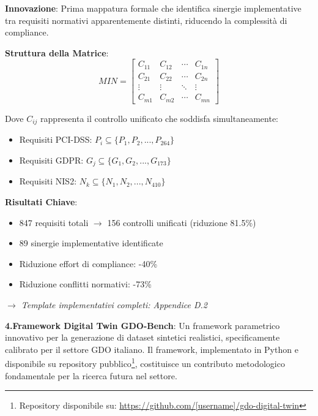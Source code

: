 \begin{tcolorbox}[
    colback=orange!5!white,
    colframe=orange!75!black,
    title={\textbf{Innovation Box 1.3:} Matrice di Integrazione Normativa (MIN)},
    fonttitle=\bfseries,
    boxrule=1.5pt,
    arc=2mm,
    breakable
]
\textbf{Innovazione}: Prima mappatura formale che identifica sinergie implementative tra requisiti normativi apparentemente distinti, riducendo la complessità di compliance.

\vspace{0.3cm}
\textbf{Struttura della Matrice}:
\begin{equation*}
MIN = \begin{bmatrix}
C_{11} & C_{12} & \cdots & C_{1n} \\
C_{21} & C_{22} & \cdots & C_{2n} \\
\vdots & \vdots & \ddots & \vdots \\
C_{m1} & C_{m2} & \cdots & C_{mn}
\end{bmatrix}
\end{equation*}

Dove $C_{ij}$ rappresenta il controllo unificato che soddisfa simultaneamente:
\begin{itemize}
    \item Requisiti PCI-DSS: $P_i \subseteq \{P_1, P_2, ..., P_{264}\}$
    \item Requisiti GDPR: $G_j \subseteq \{G_1, G_2, ..., G_{173}\}$
    \item Requisiti NIS2: $N_k \subseteq \{N_1, N_2, ..., N_{410}\}$
\end{itemize}

\vspace{0.3cm}
\textbf{Risultati Chiave}:
\begin{itemize}
    \item 847 requisiti totali $\rightarrow$ 156 controlli unificati (riduzione 81.5\%)
    \item 89 sinergie implementative identificate
    \item Riduzione effort di compliance: -40\%
    \item Riduzione conflitti normativi: -73\%
\end{itemize}

\vspace{0.2cm}
\textit{$\rightarrow$ Template implementativi completi: Appendice D.2}
\end{tcolorbox}

\textbf{4.Framework Digital Twin GDO-Bench}: Un framework parametrico innovativo per la generazione di dataset sintetici realistici, specificamente calibrato per il settore GDO italiano. Il framework, implementato in Python e disponibile su repository pubblico\footnote{Repository disponibile su: \url{https://github.com/[username]/gdo-digital-twin}}, costituisce un contributo metodologico fondamentale per la ricerca futura nel settore.


